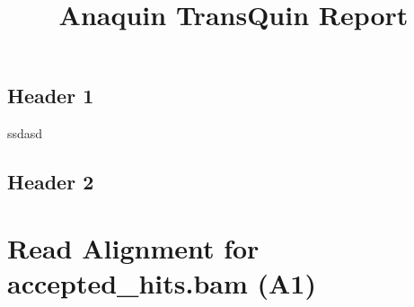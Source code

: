 \documentclass[]{article}
\title{Anaquin TransQuin Report}
\author{}
\date{}
\begin{document}
\maketitle


{
\hypersetup{linkcolor=black}
\setcounter{tocdepth}{2}
\tableofcontents
}
\subsection{Header 1}\label{header-1}

ssdasd

\subsection{Header 2}\label{header-2}

\section{Read Alignment for accepted\_hits.bam
(A1)}\label{read-alignment-for-acceptedux5fhits.bam-a1}
\end{document}
